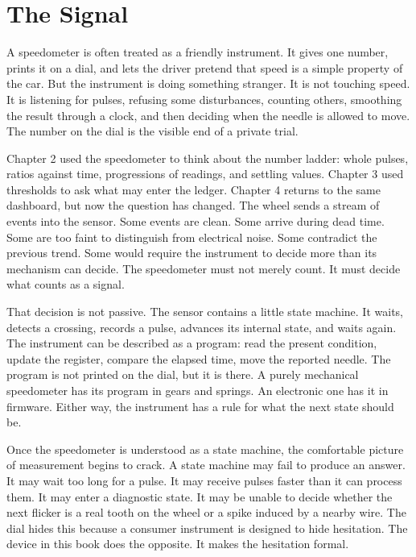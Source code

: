 \chapter{The Signal}
\label{chap:the-signal}


A speedometer is often treated as a friendly instrument. It gives one number,
prints it on a dial, and lets the driver pretend that speed is a simple
property of the car. But the instrument is doing something stranger. It is not
touching speed. It is listening for pulses, refusing some disturbances,
counting others, smoothing the result through a clock, and then deciding when
the needle is allowed to move. The number on the dial is the visible end of a
private trial.

Chapter 2 used the speedometer to think about the number ladder: whole pulses,
ratios against time, progressions of readings, and settling values. Chapter 3
used thresholds to ask what may enter the ledger. Chapter 4 returns to the
same dashboard, but now the question has changed. The wheel sends a stream of
events into the sensor. Some events are clean. Some arrive during dead time.
Some are too faint to distinguish from electrical noise. Some contradict the
previous trend. Some would require the instrument to decide more than its
mechanism can decide. The speedometer must not merely count. It must decide
what counts as a signal.

That decision is not passive. The sensor contains a little state machine. It
waits, detects a crossing, records a pulse, advances its internal state, and
waits again. The instrument can be described as a program: read the present
condition, update the register, compare the elapsed time, move the reported
needle. The program is not printed on the dial, but it is there. A purely
mechanical speedometer has its program in gears and springs. An electronic one
has it in firmware. Either way, the instrument has a rule for what the next
state should be.

Once the speedometer is understood as a state machine, the comfortable picture
of measurement begins to crack. A state machine may fail to produce an answer.
It may wait too long for a pulse. It may receive pulses faster than it can
process them. It may enter a diagnostic state. It may be unable to decide
whether the next flicker is a real tooth on the wheel or a spike induced by a
nearby wire. The dial hides this because a consumer instrument is designed to
hide hesitation. The device in this book does the opposite. It makes the
hesitation formal.

